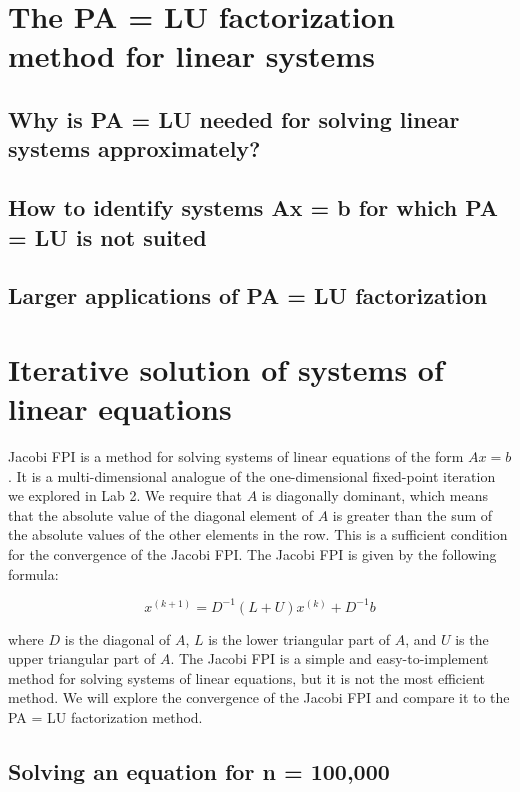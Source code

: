 \documentclass[11pt]{article}
\begin{document}
\section{The PA = LU factorization method for linear systems}

\subsection{Why is PA = LU needed for solving linear systems approximately?}

\subsection{How to identify systems Ax = b for which PA = LU is not suited}

\subsection{Larger applications of PA = LU factorization}

\section{Iterative solution of systems of linear equations}

Jacobi FPI is a method for solving systems of linear equations of the form $Ax = b$. It is a multi-dimensional analogue of the one-dimensional fixed-point iteration we explored in Lab 2. We require that $A$ is diagonally dominant, which means that the absolute value of the diagonal element of $A$ is greater than the sum of the absolute values of the other elements in the row. This is a sufficient condition for the convergence of the Jacobi FPI. The Jacobi FPI is given by the following formula:

\begin{equation}
x^{(k+1)} = D^{-1}(L+U)x^{(k)} + D^{-1}b
\end{equation}

where $D$ is the diagonal of $A$, $L$ is the lower triangular part of $A$, and $U$ is the upper triangular part of $A$. The Jacobi FPI is a simple and easy-to-implement method for solving systems of linear equations, but it is not the most efficient method. We will explore the convergence of the Jacobi FPI and compare it to the PA = LU factorization method.

\subsection{Solving an equation for n = 100,000}
\end{document}
